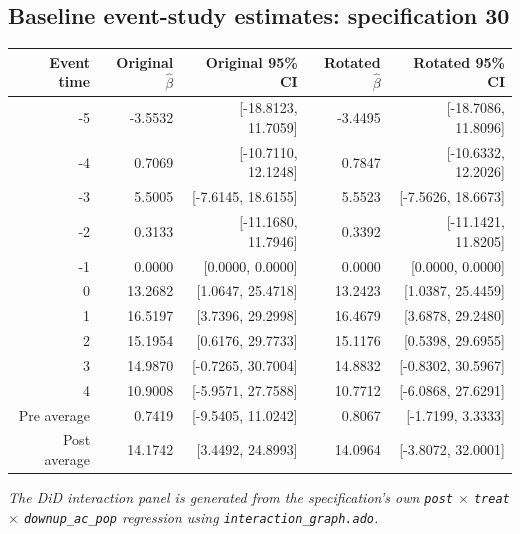 \documentclass[10pt]{article}
\begin{document}
\subsection*{Baseline event-study estimates: specification 30}
\begin{center}
\scriptsize
\begin{tabular}{r rr rr}
\toprule
Event time & Original $\hat\beta$ & Original 95\% CI & Rotated $\hat\beta$ & Rotated 95\% CI \\
\midrule
-5 & -3.5532 & [-18.8123, 11.7059] & -3.4495 & [-18.7086, 11.8096] \\
-4 & 0.7069 & [-10.7110, 12.1248] & 0.7847 & [-10.6332, 12.2026] \\
-3 & 5.5005 & [-7.6145, 18.6155] & 5.5523 & [-7.5626, 18.6673] \\
-2 & 0.3133 & [-11.1680, 11.7946] & 0.3392 & [-11.1421, 11.8205] \\
-1 & 0.0000 & [0.0000, 0.0000] & 0.0000 & [0.0000, 0.0000] \\
0 & 13.2682 & [1.0647, 25.4718] & 13.2423 & [1.0387, 25.4459] \\
1 & 16.5197 & [3.7396, 29.2998] & 16.4679 & [3.6878, 29.2480] \\
2 & 15.1954 & [0.6176, 29.7733] & 15.1176 & [0.5398, 29.6955] \\
3 & 14.9870 & [-0.7265, 30.7004] & 14.8832 & [-0.8302, 30.5967] \\
4 & 10.9008 & [-5.9571, 27.7588] & 10.7712 & [-6.0868, 27.6291] \\
\midrule
Pre average & 0.7419 & [-9.5405, 11.0242] & 0.8067 & [-1.7199, 3.3333] \\
Post average & 14.1742 & [3.4492, 24.8993] & 14.0964 & [-3.8072, 32.0001] \\
\bottomrule
\end{tabular}
\end{center}
\medskip
\textit{The DiD interaction panel is generated from the specification's own \texttt{post} $\times$ \texttt{treat} $\times$ \texttt{downup\_ac\_pop} regression using \texttt{interaction\_graph.ado}.}
\clearpage
\end{document}
